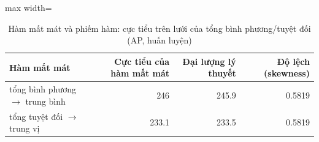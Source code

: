 \begin{table}[H]
\centering\footnotesize
\caption{Hàm mất mát và phiếm hàm: cực tiểu trên lưới của tổng bình phương/tuyệt đối (AP, huấn luyện)}\label{tab:tab_b12_13_loss_functional}
\begin{adjustbox}{max width=\linewidth}
\begin{tabular}{|>{\raggedright\arraybackslash}p{}|r|r|r|}
\toprule
Hàm mất mát & Cực tiểu của hàm mất mát & Đại lượng lý thuyết & Độ lệch (skewness) \\
\midrule
tổng bình phương $\to$ trung bình & 246 & 245.9 & 0.5819 \\[3pt]
tổng tuyệt đối $\to$ trung vị & 233.1 & 233.5 & 0.5819 \\[3pt]
\bottomrule
\end{tabular}
\end{adjustbox}
\end{table}
